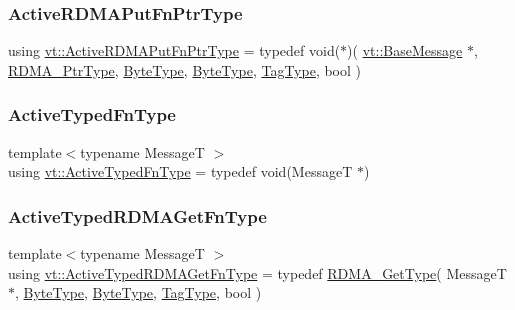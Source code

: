 \mbox{\label{namespacevt_a23220eaaee4345f7371d35e3aee23c70}} 
\subsubsection{\texorpdfstring{Active\+R\+D\+M\+A\+Put\+Fn\+Ptr\+Type}{ActiveRDMAPutFnPtrType}}
{\footnotesize\ttfamily using \hyperlink{namespacevt_a23220eaaee4345f7371d35e3aee23c70}{vt\+::\+Active\+R\+D\+M\+A\+Put\+Fn\+Ptr\+Type} = typedef void($\ast$)( \hyperlink{namespacevt_ac34f95a5e2b8109b55bfba52b074443d}{vt\+::\+Base\+Message} $\ast$, \hyperlink{namespacevt_a9e2c953286c7616f7c218e9951790776}{R\+D\+M\+A\+\_\+\+Ptr\+Type}, \hyperlink{namespacevt_aab8d55968084610ce3b17057981e9300}{Byte\+Type}, \hyperlink{namespacevt_aab8d55968084610ce3b17057981e9300}{Byte\+Type}, \hyperlink{namespacevt_a84ab281dae04a52a4b243d6bf62d0e52}{Tag\+Type}, bool )}

\mbox{\label{namespacevt_a54eefd5373739c7365058b0d22fea6e2}} 
\subsubsection{\texorpdfstring{Active\+Typed\+Fn\+Type}{ActiveTypedFnType}}
{\footnotesize\ttfamily template$<$typename MessageT $>$ \\
using \hyperlink{namespacevt_a54eefd5373739c7365058b0d22fea6e2}{vt\+::\+Active\+Typed\+Fn\+Type} = typedef void(MessageT $\ast$)}

\mbox{\label{namespacevt_add83fe11410931719f6543a575acfe87}} 
\subsubsection{\texorpdfstring{Active\+Typed\+R\+D\+M\+A\+Get\+Fn\+Type}{ActiveTypedRDMAGetFnType}}
{\footnotesize\ttfamily template$<$typename MessageT $>$ \\
using \hyperlink{namespacevt_add83fe11410931719f6543a575acfe87}{vt\+::\+Active\+Typed\+R\+D\+M\+A\+Get\+Fn\+Type} = typedef \hyperlink{namespacevt_a1cab7f4860f65a49ad2c042d6240f288}{R\+D\+M\+A\+\_\+\+Get\+Type}( MessageT$\ast$, \hyperlink{namespacevt_aab8d55968084610ce3b17057981e9300}{Byte\+Type}, \hyperlink{namespacevt_aab8d55968084610ce3b17057981e9300}{Byte\+Type}, \hyperlink{namespacevt_a84ab281dae04a52a4b243d6bf62d0e52}{Tag\+Type}, bool )}

